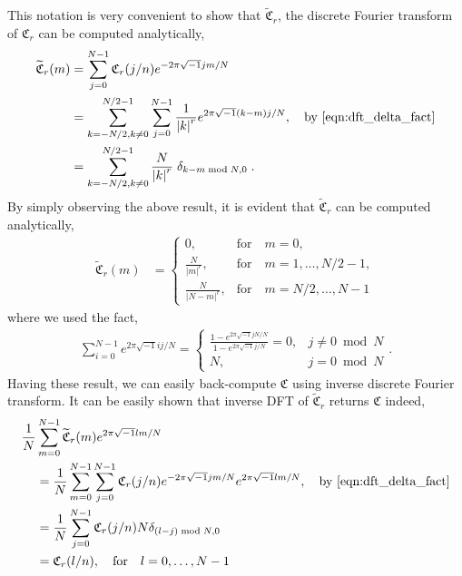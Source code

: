 \documentclass{iitthesis}          %
\def\abs#1{\ensuremath{\left \lvert #1 \right \rvert}}
\begin{document}
This notation is very convenient to show that $\widetilde{\mathfrak{C}}_r$,  the discrete Fourier transform of $\mathfrak{C}_r$ can be computed analytically,
\begin{align*}
\widetilde{\mathfrak{C}}_r(m) &= \sum_{j=0}^{N-1} \mathfrak{C}_r (j/n) e^{- 2 \pi\sqrt{-1} jm/N} 
\\
&= \sum_{k = - N/2, k \neq 0 }^{N/2-1} 
\sum_{j=0}^{N-1} \frac{1}{\abs{k}^r} e^{ 2 \pi\sqrt{-1} (k-m)  j/N} , \quad \text{by \ref{eqn:dft_delta_fact}}
\\
&= \sum_{k = - N/2, k \neq 0  }^{N/2-1} \frac{N}{\abs{k}^r} \; \delta_{k-m \bmod N, 0} \; .
\end{align*}
By simply observing the above result, it is evident that $\widetilde{\mathfrak{C}}_r$ can be computed analytically,
\begin{align} \label{dft_of_g}
\widetilde{\mathfrak{C}}_r(m) &= 
\begin{cases}
0, & \text{for} \quad m=0,\\
\frac{N}{\abs{m}^r}, & \text{for} \quad m=1,\dots,N/2-1, \\
\frac{N}{\abs{N-m}^r}, & \text{for} \quad m=N/2,\dots,N-1
\end{cases}
\end{align}
where we used the fact,
\begin{align}
\label{eqn:dft_delta_fact}
\sum_{i=0}^{N-1} e^{2 \pi \sqrt{-1} i j /N} = 
\begin{cases}
\frac{1 - e^{2\pi \sqrt{-1} j N /N}}{1 - e^{2\pi \sqrt{-1} j /N}} = 0, &j \ne 0 \bmod N
\\
N, & j = 0 \bmod N
\end{cases}.
\end{align}
Having these result, we can easily back-compute $\mathfrak{C}$ using inverse discrete Fourier transform. It can be easily shown that inverse DFT of $\widetilde{\mathfrak{C}}_{r}$ returns $\mathfrak{C}$ indeed,
\begin{align*}
\frac{1}{N} &\sum_{m=0}^{N-1} \widetilde{\mathfrak{C}}_{r} (m) e^{2 \pi\sqrt{-1} lm/N} \\
& = \frac{1}{N} \sum_{m=0}^{N-1} 
\sum_{j=0}^{N-1} \mathfrak{C}_{r} (j/n) e^{- 2 \pi\sqrt{-1} jm/N}
e^{2 \pi\sqrt{-1} lm/N}, \quad \text{by \ref{eqn:dft_delta_fact}}  \\
& = \frac{1}{N}  \sum_{j=0}^{N-1} \mathfrak{C}_{r} (j/n) N \delta_{(l-j) \bmod N, 0} \\
& = \mathfrak{C}_{r} (l/n), \quad \text{for} \quad l=0,\dots,N-1
\end{align*}
\end{document}
